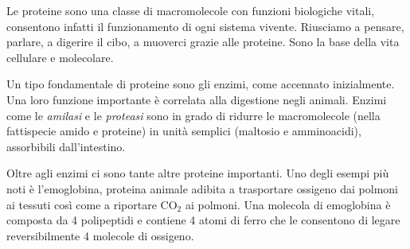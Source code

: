 \par Le proteine sono una classe di macromolecole con funzioni biologiche vitali, consentono infatti il funzionamento di ogni sistema vivente. Riusciamo a pensare, parlare, a digerire il cibo, a muoverci grazie alle proteine. Sono la base della vita cellulare e molecolare. 

\par Un tipo fondamentale di proteine sono gli enzimi, come accennato inizialmente. Una loro funzione importante è correlata alla digestione negli animali. Enzimi come le \textit{amilasi} e le \textit{proteasi }sono in grado di ridurre le macromolecole (nella fattispecie amido e proteine) in unità semplici (maltosio e amminoacidi), assorbibili dall'intestino.

\par Oltre agli enzimi ci sono tante altre proteine importanti. Uno degli esempi più noti è l'emoglobina, proteina animale adibita a trasportare ossigeno dai polmoni ai tessuti così come a riportare CO$_{2}$ ai polmoni. Una molecola di emoglobina è composta da 4 polipeptidi e contiene 4 atomi di ferro che le consentono di legare reversibilmente 4 molecole di ossigeno.

